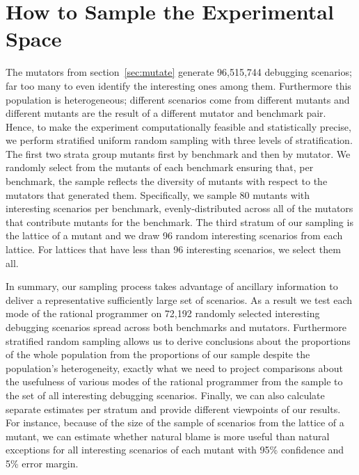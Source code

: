 \section{How to Sample the Experimental Space} 

The mutators from section~\ref{sec:mutate} generate 96,515,744 debugging
scenarios; far too many to even identify the interesting ones among them.
Furthermore this population is heterogeneous; different scenarios come
from different mutants and different mutants are the result of a
different mutator and benchmark pair. Hence, to make the experiment
computationally feasible and statistically precise, we perform stratified
uniform random sampling with three levels of stratification.  The first
two strata group mutants first by benchmark and then by mutator. 
We randomly select from the mutants of
each benchmark ensuring that, per
benchmark, the sample reflects the diversity of mutants with respect to
the mutators that generated them.  Specifically,  we sample 80 mutants
with interesting scenarios per benchmark,  evenly-distributed across all
of the mutators that contribute mutants for the benchmark.  The third
stratum of our sampling is the lattice of a mutant and we draw 96 random
interesting scenarios from each lattice. For lattices that have less than
96 interesting scenarios, we select them all.

In summary, our sampling process takes advantage of ancillary information
to deliver a representative sufficiently large set of scenarios. As a result we test each
mode of the rational programmer on 72,192 randomly selected interesting
debugging scenarios spread across both benchmarks and mutators.
Furthermore stratified random sampling allows us to derive conclusions
about the proportions of the whole population from the proportions of
our sample despite the population's heterogeneity, exactly what we need to project comparisons about the
usefulness of various modes of the
rational programmer from the sample to the set of all interesting debugging
scenarios.  Finally, we can also calculate separate estimates per stratum and provide different
viewpoints of our results. For instance, because of the size of the sample
of scenarios from the lattice of a mutant, we can estimate whether natural
blame is more useful than natural exceptions for all interesting scenarios
of each mutant with 95\% confidence and 5\% error margin.

 



